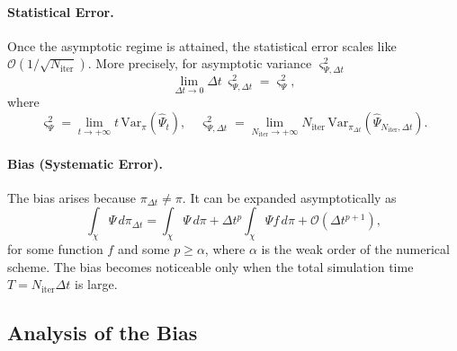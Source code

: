 \documentclass[11pt, twoside]{report}
\begin{document}
\paragraph{Statistical Error.}
Once the asymptotic regime is attained, the statistical error scales like $\mathcal{O}(1/\sqrt{N_{\text{iter}}})$. More precisely, for asymptotic variance $\varsigma_{\Psi,\Delta t}^2$
\[
\lim_{\Delta t \to 0} \Delta t \, \varsigma_{\Psi,\Delta t}^2 = \varsigma_\Psi^2,
\]
where
\[
\varsigma_\Psi^2 = \lim_{t \to +\infty} t \, \mathrm{Var}_\pi(\hat{\Psi}_t), \quad \varsigma_{\Psi,\Delta t}^2 = \lim_{N_{\text{iter}} \to +\infty} N_{\text{iter}} \, \mathrm{Var}_{\pi_{\Delta t}}\left( \widehat{\Psi}_{N_{\text{iter}},\Delta t} \right).
\]

\paragraph{Bias (Systematic Error).}
The bias arises because $\pi_{\Delta t} \neq \pi$. It can be expanded asymptotically as
\begin{equation} \label{bias_error}
    \int_{\chi} \Psi \, d\pi_{\Delta t} = \int_{\chi} \Psi \, d\pi + \Delta t^p \int_{\chi} \Psi f \, d\pi + \mathcal{O}(\Delta t^{p+1}),
\end{equation}
for some function $f$ and some $p \geq \alpha$, where $\alpha$ is the weak order of the numerical scheme. The bias becomes noticeable only when the total simulation time $T = N_{\text{iter}} \Delta t$ is large.
\subsection{Analysis of the Bias} \label{sec:ana_bias}
\end{document}
